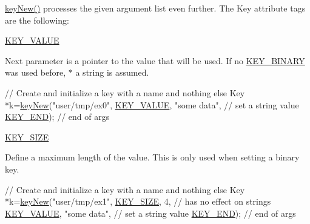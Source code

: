 \hyperlink{group__key_gad23c65b44bf48d773759e1f9a4d43b89}{key\-New()} processes the given argument list even further. The Key attribute tags are the following\-:
\begin{DoxyItemize}
\item \hyperlink{group__key_gga91fb3178848bd682000958089abbaf40ac66e4a49d09212b79f5754ca6db5bd2e}{K\-E\-Y\-\_\-\-V\-A\-L\-U\-E} \par
 Next parameter is a pointer to the value that will be used. If no \hyperlink{group__key_gga91fb3178848bd682000958089abbaf40a1ca18d4e094ae7487d35ecedda2235ff}{K\-E\-Y\-\_\-\-B\-I\-N\-A\-R\-Y} was used before, $\ast$ a string is assumed. 
\begin{DoxyCodeInclude}
\textcolor{comment}{// Create and initialize a key with a name and nothing else}
Key *k=\hyperlink{group__key_gad23c65b44bf48d773759e1f9a4d43b89}{keyNew}(\textcolor{stringliteral}{"user/tmp/ex0"},
        \hyperlink{group__key_gga91fb3178848bd682000958089abbaf40ac66e4a49d09212b79f5754ca6db5bd2e}{KEY\_VALUE}, \textcolor{stringliteral}{"some data"},    \textcolor{comment}{// set a string value}
        \hyperlink{group__key_gga91fb3178848bd682000958089abbaf40aa8adb6fcb92dec58fb19410eacfdd403}{KEY\_END});                  \textcolor{comment}{// end of args}
\end{DoxyCodeInclude}

\item \hyperlink{group__key_gga91fb3178848bd682000958089abbaf40a6d531b5c41445d19d0452eebdccbfa01}{K\-E\-Y\-\_\-\-S\-I\-Z\-E} \par
 Define a maximum length of the value. This is only used when setting a binary key. 
\begin{DoxyCodeInclude}
\textcolor{comment}{// Create and initialize a key with a name and nothing else}
Key *k=\hyperlink{group__key_gad23c65b44bf48d773759e1f9a4d43b89}{keyNew}(\textcolor{stringliteral}{"user/tmp/ex1"},
        \hyperlink{group__key_gga91fb3178848bd682000958089abbaf40a6d531b5c41445d19d0452eebdccbfa01}{KEY\_SIZE}, 4,               \textcolor{comment}{// has no effect on strings}
        \hyperlink{group__key_gga91fb3178848bd682000958089abbaf40ac66e4a49d09212b79f5754ca6db5bd2e}{KEY\_VALUE}, \textcolor{stringliteral}{"some data"},    \textcolor{comment}{// set a string value}
        \hyperlink{group__key_gga91fb3178848bd682000958089abbaf40aa8adb6fcb92dec58fb19410eacfdd403}{KEY\_END});                  \textcolor{comment}{// end of args}
\end{DoxyCodeInclude}


\end{DoxyItemize}
